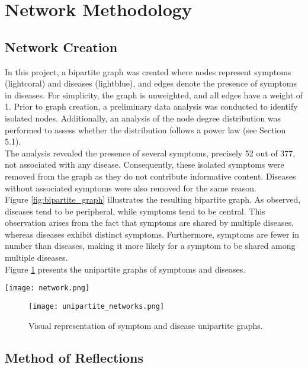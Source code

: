 \section{Network Methodology}
\subsection{Network Creation}
In this project, a bipartite graph was created where nodes represent symptoms (lightcoral) and diseases (lightblue),
and edges denote the presence of symptoms in diseases.
For simplicity, the graph is unweighted, and all edges have a weight of 1.
Prior to graph creation, a preliminary data analysis was conducted to identify isolated nodes.
Additionally, an analysis of the node degree distribution was performed to assess whether the distribution follows a power law (see Section 5.1).\\
The analysis revealed the presence of several symptoms, precisely 52 out of 377, not associated with any disease.
Consequently, these isolated symptoms were removed from the graph as they do not contribute informative content.
Diseases without associated symptoms were also removed for the same reason.\\
Figure \ref{fig:bipartite_graph} illustrates the resulting bipartite graph. As observed, diseases tend to be peripheral,
while symptoms tend to be central. This observation arises from the fact that symptoms are shared by multiple diseases,
whereas diseases exhibit distinct symptoms. Furthermore, symptoms are fewer in number than diseases,
making it more likely for a symptom to be shared among multiple diseases.\\
Figure \ref{fig:unipartite_graphs} presents the unipartite graphs of symptoms and diseases.
\begin{figure*}[thbp]
    \centering
    \texttt{[image: network.png]}
    \caption{Visual representation of the symptom-disease bipartite graph.}
    \label{fig:bipartite_graph}
\end{figure*}
\noindent

\begin{figure}[H]
    \centering
    \texttt{[image: unipartite\_networks.png]}
    \caption{Visual representation of symptom and disease unipartite graphs.}
    \label{fig:unipartite_graphs}
\end{figure}
\noindent

\subsection{Method of Reflections}

